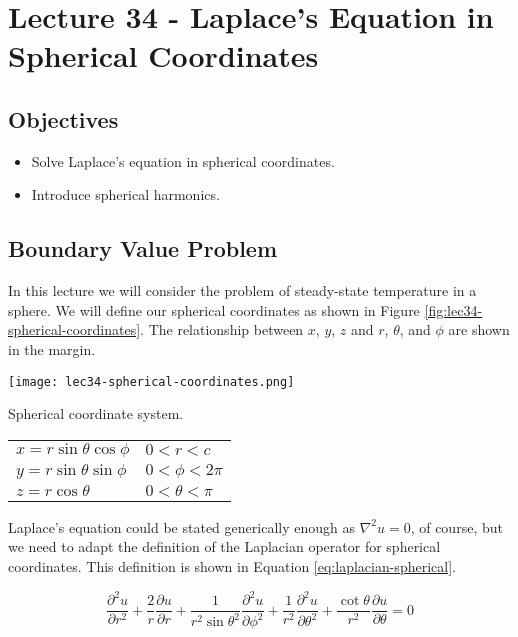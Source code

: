 \chapter{Lecture 34 - Laplace's Equation in Spherical Coordinates}
\label{ch:lec34}
\section{Objectives}
\begin{itemize}
\item Solve Laplace's equation in spherical coordinates. 
\item Introduce spherical harmonics.
\end{itemize}
\setcounter{lstannotation}{0}

\section{Boundary Value Problem}

In this lecture we will consider the problem of steady-state temperature in a sphere.  We will define our spherical coordinates as shown in Figure \ref{fig:lec34-spherical-coordinates}.  The relationship between $x$, $y$, $z$ and $r$, $\theta$, and $\phi$ are shown in the margin.
\begin{marginfigure}
\texttt{[image: lec34-spherical-coordinates.png]}
\caption{Spherical coordinate system.}
\label{fig:lec34-spherical-coordinates}
\end{marginfigure}
\begin{margintable}
\begin{tabular}{l l}
$x = r\sin{\theta}\cos{\phi}$ & $0<r<c$ \\
$y = r\sin{\theta}\sin{\phi}$ & $0< \phi < 2\pi$ \\
$z = r\cos{\theta}$ & $0 < \theta < \pi$ \\
\end{tabular}
\end{margintable}

Laplace's equation could be stated generically enough as $\nabla^2u = 0$, of course, but we need to adapt the definition of the Laplacian operator for spherical coordinates.  This definition is shown in Equation \ref{eq:laplacian-spherical}.

\begin{equation}
\frac{\partial^2 u}{\partial r^2} + \frac{2}{r}\frac{\partial u}{\partial r} + \frac{1}{r^2 \sin{\theta}^2} \frac{\partial^2 u}{\partial \phi^2} + \frac{1}{r^2}\frac{\partial^2 u}{\partial \theta^2} + \frac{\cot{\theta}}{r^2}\frac{\partial u}{\partial \theta} = 0
\label{eq:laplacian-spherical}
\end{equation}

